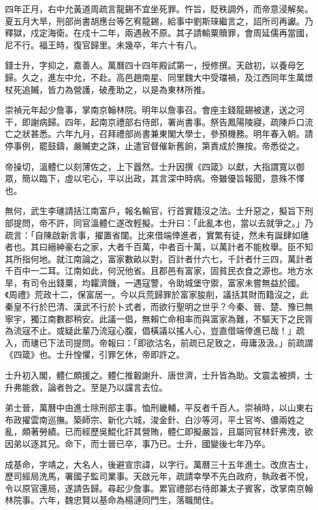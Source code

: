 \begin{pinyinscope}
四年正月，右中允黃道周疏言龍錫不宜坐死罪。忤旨，貶秩調外，而帝意浸解矣。夏五月大旱，刑部尚書胡應台等乞宥龍錫，給事中劉斯琜繼言之，詔所司再讞。乃釋獄，戍定海衛。在戍十二年，兩遇赦不原。其子請輸粟贖罪，會周延儒再當國，尼不行。福王時，復官歸里。未幾卒，年六十有八。

錢士升，字抑之，嘉善人。萬曆四十四年殿試第一，授修撰。天啟初，以養母乞歸。久之，進左中允，不赴。高邑趙南星、同里魏大中受璫禍，及江西同年生萬燝杖死追贓，皆力為營護，破產助之，以是為東林所推。

崇禎元年起少詹事，掌南京翰林院。明年以詹事召。會座主錢龍錫被逮，送之河干，即謝病歸。四年，起南京禮部右侍郎，署尚書事。祭告鳳陽陵寢，疏陳戶口流亡之狀甚悉。六年九月，召拜禮部尚書兼東閣大學士，參預機務。明年春入朝。請停事例，罷鼓鑄，嚴贓吏之誅，止遣官督催新舊餉，第責成於撫按。帝悉從之。

帝操切，溫體仁以刻薄佐之，上下囂然。士升因撰《四箴》以獻，大指謂寬以御眾，簡以臨下，虛以宅心，平以出政，其言深中時病。帝雖優旨報聞，意殊不懌也。

無何，武生李璡請括江南富戶，報名輸官，行首實籍沒之法。士升惡之，擬旨下刑部提問，帝不許，同官溫體仁遂改輕擬。士升曰：「此亂本也，當以去就爭之。」乃疏言：「自陳啟新言事，擢置省闥。比來借端倖進者，實繁有徒，然未有誕肆如璡者也。其曰縉紳豪右之家，大者千百萬，中者百十萬，以萬計者不能枚舉。臣不知其所指何地。就江南論之，富家數畝以對，百計者什六七，千計者什三四，萬計者千百中一二耳。江南如此，何況他省。且郡邑有富家，固貧民衣食之源也。地方水旱，有司令出錢粟，均糶濟饑，一遇寇警，令助城堡守禦，富家未嘗無益於國。《周禮》荒政十二，保富居一。今以兵荒歸罪於富家朘削，議括其財而籍沒之，此秦皇不行於巴清、漢武不行於卜式者，而欲行聖明之世乎？今秦、晉、楚、豫已無寧宇，獨江南數郡稍安。此議一倡，無賴亡命相率而與富家為難，不驅天下之民胥為流寇不止。或疑此輩乃流寇心腹，倡橫議以搖人心，豈直借端倖進已哉！」疏入，而璡已下法司提問。帝報曰：「即欲沽名，前疏已足致之，毋庸汲汲。」前疏謂《四箴》也。士升惶懼，引罪乞休，帝即許之。

士升初入閣，體仁頗援之。體仁推轂謝升、唐世濟，士升皆為助。文震孟被擠，士升弗能救，論者咎之。至是乃以讜言去位。

弟士晉，萬曆中由進士除刑部主事。恤刑畿輔，平反者千百人。崇禎時，以山東右布政擢雲南巡撫。築師宗、新化六城，浚金針、白沙等河，平土官岑、儂兩姓之亂，頗著勞績。已而經歷吳鯤化訐其營賄，體仁即擬嚴旨，且屬同官林釬弗洩，欲因弟以逐其兄。命下，而士晉已卒，事乃已。士升，國變後七年乃卒。

成基命，字靖之，大名人，後避宣宗諱，以字行。萬曆三十五年進士。改庶吉士，歷司經局洗馬，署國子監司業事。天啟元年，疏請幸學不先白政府，執政者不悅，令以原官還局，遂請告歸。尋起少詹事。累官禮部右侍郎兼太子賓客，改掌南京翰林院事。六年，魏忠賢以基命為楊漣同門生，落職閒住。


\end{pinyinscope}
